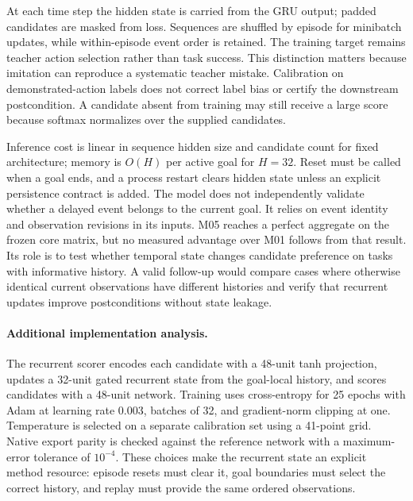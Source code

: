 At each time step the hidden state is carried from the GRU output; padded candidates are masked from loss. Sequences are shuffled by episode for minibatch updates, while within-episode event order is retained. The training target remains teacher action selection rather than task success. This distinction matters because imitation can reproduce a systematic teacher mistake. Calibration on demonstrated-action labels does not correct label bias or certify the downstream postcondition. A candidate absent from training may still receive a large score because softmax normalizes over the supplied candidates.

Inference cost is linear in sequence hidden size and candidate count for fixed architecture; memory is $O(H)$ per active goal for $H=32$. Reset must be called when a goal ends, and a process restart clears hidden state unless an explicit persistence contract is added. The model does not independently validate whether a delayed event belongs to the current goal. It relies on event identity and observation revisions in its inputs. M05 reaches a perfect aggregate on the frozen core matrix, but no measured advantage over M01 follows from that result. Its role is to test whether temporal state changes candidate preference on tasks with informative history. A valid follow-up would compare cases where otherwise identical current observations have different histories and verify that recurrent updates improve postconditions without state leakage.



\paragraph{Additional implementation analysis.} The recurrent scorer encodes each candidate with a 48-unit tanh projection, updates a 32-unit gated recurrent state from the goal-local history, and scores candidates with a 48-unit network. Training uses cross-entropy for 25 epochs with Adam at learning rate 0.003, batches of 32, and gradient-norm clipping at one. Temperature is selected on a separate calibration set using a 41-point grid. Native export parity is checked against the reference network with a maximum-error tolerance of $10^{-4}$. These choices make the recurrent state an explicit method resource: episode resets must clear it, goal boundaries must select the correct history, and replay must provide the same ordered observations.

